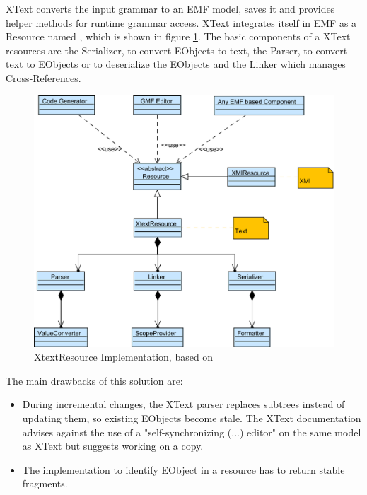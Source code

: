 XText converts the input grammar to an EMF model, saves it and provides helper methods for runtime grammar access. XText integrates itself in EMF as a Resource named , which is shown in figure \ref{XtextArch}.  The basic components of a XText resources are the Serializer, to convert EObjects to text, the Parser, to convert text to EObjects or to deserialize the EObjects and the Linker which manages Cross-References. 

\begin{figure}
\centering
\includegraphics[scale=0.75]{gfx/ex/Xtext} 
\caption{XtextResource Implementation, based on \cite{XTextMan}}
\label{XtextArch}
\end{figure}
The main drawbacks of this solution are:
\begin{itemize}
	\item During incremental changes, the XText parser replaces subtrees instead of updating them, so existing EObjects become stale. The XText documentation advises against the use of a "self-synchronizing (...) editor" on the same model as XText but suggests working on a copy.
	\item The implementation to identify EObject in a resource has to return stable fragments.
\end{itemize}

